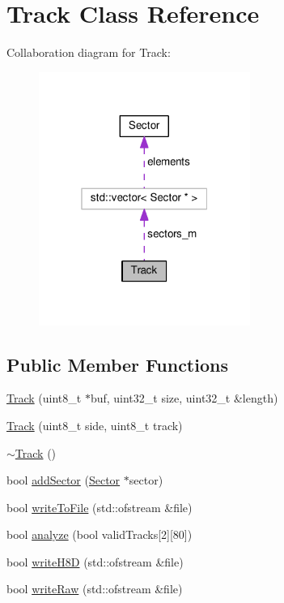 \hypertarget{classTrack}{}\section{Track Class Reference}
\label{classTrack}


Collaboration diagram for Track\+:
\nopagebreak
\begin{figure}[H]
\begin{center}
\leavevmode
\includegraphics[width=196pt]{classTrack__coll__graph}
\end{center}
\end{figure}
\subsection*{Public Member Functions}
\begin{DoxyCompactItemize}
\item 
\hyperlink{classTrack_a62eb2440ac055145ef72e27c5d2682b9}{Track} (uint8\+\_\+t $\ast$buf, uint32\+\_\+t size, uint32\+\_\+t \&length)
\item 
\hyperlink{classTrack_a15b3b2cda8f475ce63246c54c2b1d1e3}{Track} (uint8\+\_\+t side, uint8\+\_\+t track)
\item 
\hyperlink{classTrack_a416e75e66accc8eb9e3fafc3e8555216}{$\sim$\+Track} ()
\item 
bool \hyperlink{classTrack_a3020851356d50989d19e0d1289dad1c6}{add\+Sector} (\hyperlink{classSector}{Sector} $\ast$sector)
\item 
bool \hyperlink{classTrack_a8286a129153c40587bdf984e5f25cb87}{write\+To\+File} (std\+::ofstream \&file)
\item 
bool \hyperlink{classTrack_a043395f2b113c1d9c2c3ba413d51b470}{analyze} (bool valid\+Tracks\mbox{[}2\mbox{]}\mbox{[}80\mbox{]})
\item 
bool \hyperlink{classTrack_a9d6893017cc8f7e438fe5ab6b8fd86b2}{write\+H8\+D} (std\+::ofstream \&file)
\item 
bool \hyperlink{classTrack_ae412c34ba23acafdc10fa80dc0f77b60}{write\+Raw} (std\+::ofstream \&file)
\end{DoxyCompactItemize}
